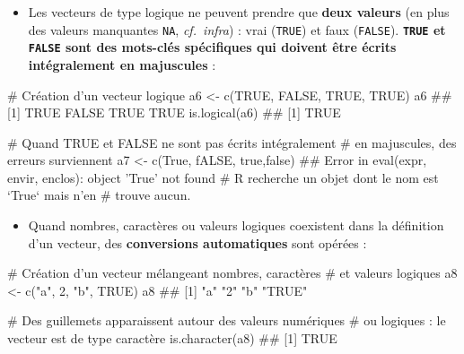 \documentclass[12pt,twosided, notitlepage]{book}
\newenvironment{Shaded}{}{}
\newcommand{\CommentTok}[1]{\textcolor[rgb]{0.00,0.50,0.00}{#1}}
\newcommand{\DecValTok}[1]{#1}
\newcommand{\KeywordTok}[1]{\textcolor[rgb]{0.00,0.00,1.00}{#1}}
\newcommand{\NormalTok}[1]{#1}
\newcommand{\OtherTok}[1]{\textcolor[rgb]{1.00,0.25,0.00}{#1}}
\newcommand{\StringTok}[1]{\textcolor[rgb]{0.00,0.50,0.50}{#1}}
\providecommand{\tightlist}{%
  \setlength{\itemsep}{0pt}\setlength{\parskip}{0pt}}
\renewenvironment{Shaded}{\begin{snugshade}}{\end{snugshade}}
\begin{document}
\begin{itemize}
\tightlist
\item
  Les vecteurs de type logique ne peuvent prendre que \textbf{deux
  valeurs} (en plus des valeurs manquantes \texttt{NA},
  \emph{cf.~infra}) : vrai (\texttt{TRUE}) et faux (\texttt{FALSE}).
  \textbf{\texttt{TRUE} et \texttt{FALSE} sont des mots-clés spécifiques
  qui doivent être écrits intégralement en majuscules} :
\end{itemize}

\begin{Shaded}
\begin{Highlighting}[]
\CommentTok{# Création d'un vecteur logique}
\NormalTok{a6 <-}\StringTok{ }\KeywordTok{c}\NormalTok{(}\OtherTok{TRUE}\NormalTok{, }\OtherTok{FALSE}\NormalTok{, }\OtherTok{TRUE}\NormalTok{, }\OtherTok{TRUE}\NormalTok{)}
\NormalTok{a6}
\NormalTok{  ## [1]  TRUE FALSE  TRUE  TRUE}
\KeywordTok{is.logical}\NormalTok{(a6)}
\NormalTok{  ## [1] TRUE}

\CommentTok{# Quand TRUE et FALSE ne sont pas écrits intégralement }
\CommentTok{# en majuscules, des erreurs surviennent}
\NormalTok{a7 <-}\StringTok{ }\KeywordTok{c}\NormalTok{(True, fALSE, true,false)}
\NormalTok{  ## Error in eval(expr, envir, enclos): object 'True' not found}
\CommentTok{# R recherche un objet dont le nom est `True` mais n'en }
\CommentTok{# trouve aucun.}
\end{Highlighting}
\end{Shaded}

\begin{itemize}
\tightlist
\item
  Quand nombres, caractères ou valeurs logiques coexistent dans la
  définition d'un vecteur, des \textbf{conversions automatiques} sont
  opérées :
\end{itemize}

\begin{Shaded}
\begin{Highlighting}[]
\CommentTok{# Création d'un vecteur mélangeant nombres, caractères}
\CommentTok{# et valeurs logiques}
\NormalTok{a8 <-}\StringTok{ }\KeywordTok{c}\NormalTok{(}\StringTok{"a"}\NormalTok{, }\DecValTok{2}\NormalTok{, }\StringTok{"b"}\NormalTok{, }\OtherTok{TRUE}\NormalTok{)}
\NormalTok{a8}
\NormalTok{  ## [1] "a"    "2"    "b"    "TRUE"}

\CommentTok{# Des guillemets apparaissent autour des valeurs numériques}
\CommentTok{# ou logiques : le vecteur est de type caractère}
\KeywordTok{is.character}\NormalTok{(a8)}
\NormalTok{  ## [1] TRUE}
\end{Highlighting}
\end{Shaded}
\end{document}
